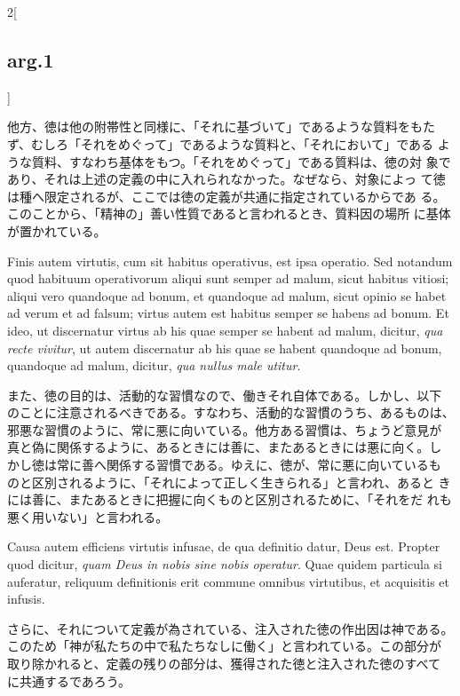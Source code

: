 \documentclass[paper=a4paper,fontsize=10pt,jafontsize=9pt,titlepage]{jlreq}
\begin{document}
\begin{paracol}{2}[\subsection{arg.1}]
\switchcolumn

他方、徳は他の附帯性と同様に、「それに基づいて」であるような質料をもた
ず、むしろ「それをめぐって」であるような質料と、「それにおいて」である
ような質料、すなわち基体をもつ。「それをめぐって」である質料は、徳の対
象であり、それは上述の定義の中に入れられなかった。なぜなら、対象によっ
て徳は種へ限定されるが、ここでは徳の定義が共通に指定されているからであ
る。このことから、「精神の」善い性質であると言われるとき、質料因の場所
に基体が置かれている。

\switchcolumn*

Finis autem virtutis, cum sit habitus operativus, est ipsa
operatio. Sed notandum quod habituum operativorum aliqui sunt semper
ad malum, sicut habitus vitiosi; aliqui vero quandoque ad bonum, et
quandoque ad malum, sicut opinio se habet ad verum et ad falsum;
virtus autem est habitus semper se habens ad bonum. Et ideo, ut
discernatur virtus ab his quae semper se habent ad malum, dicitur,
{\itshape qua recte vivitur}, ut autem discernatur ab his quae se
habent quandoque ad bonum, quandoque ad malum, dicitur, {\itshape qua
nullus male utitur}.

\switchcolumn

また、徳の目的は、活動的な習慣なので、働きそれ自体である。しかし、以下
のことに注意されるべきである。すなわち、活動的な習慣のうち、あるものは、
邪悪な習慣のように、常に悪に向いている。他方ある習慣は、ちょうど意見が
真と偽に関係するように、あるときには善に、またあるときには悪に向く。し
かし徳は常に善へ関係する習慣である。ゆえに、徳が、常に悪に向いているも
のと区別されるように、「それによって正しく生きられる」と言われ、あると
きには善に、またあるときに把握に向くものと区別されるために、「それをだ
れも悪く用いない」と言われる。

\switchcolumn*

Causa autem efficiens virtutis infusae, de qua definitio datur, Deus
est. Propter quod dicitur, {\itshape quam Deus in nobis sine nobis
operatur}. Quae quidem particula si auferatur, reliquum definitionis
erit commune omnibus virtutibus, et acquisitis et infusis.

\switchcolumn

さらに、それについて定義が為されている、注入された徳の作出因は神である。
このため「神が私たちの中で私たちなしに働く」と言われている。この部分が
取り除かれると、定義の残りの部分は、獲得された徳と注入された徳のすべて
に共通するであろう。

\switchcolumn*[\subsection{ad.1}]


\end{paracol}
\end{document}
